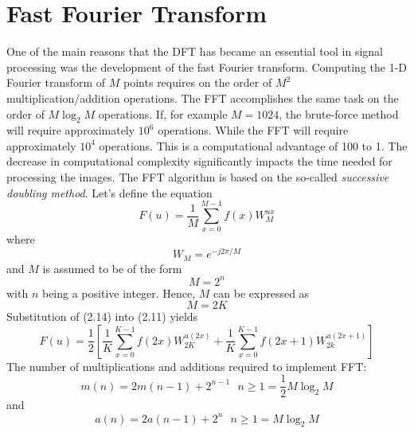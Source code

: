 \section{Fast Fourier Transform}
One of the main reasons that the DFT has became an essential tool in signal processing was the development of the fast Fourier transform. Computing the 1-D Fourier transform of $M$ points requires on the order of $M^2$ multiplication/addition operations. The FFT accomplishes the same task on the order of $M \log_2 M $ operations. If, for example $M = 1024$, the brute-force method will require approximately $10^6$ operations. While the FFT will require approximately $10^4$ operations. This is a computational advantage of 100 to 1. The decrease in computational complexity significantly impacts the time needed for processing the images. The FFT algorithm is based on the so-called \textit{successive doubling method}. Let's define the equation
\begin{equation}
	F(u) = \frac{1}{M} \sum_{x = 0}^{M - 1}f(x)W_M^{ux}
\end{equation}
where 
\begin{equation}
	W_M = e^{-j2\pi / M}
\end{equation}
and $M$ is assumed to be of the form
\begin{equation}
	M = 2^n
\end{equation}
with $n$ being a positive integer. Hence, $M$ can be expressed as 
\begin{equation}
	M = 2K
\end{equation}
Substitution of (2.14) into (2.11) yields
\begin{equation}
	F(u) = \frac{1}{2}[\frac{1}{K}\sum_{x = 0}^{K - 1} f(2x)W^{u(2x)}_{2K} + \frac{1}{K}\sum_{x = 0}^{K - 1}f(2x + 1)W_{2k}^{u(2x + 1)}]
\end{equation}
The number of multiplications and additions required to implement FFT:
\begin{equation}
	m(n) = 2m(n - 1) + 2^{n - 1} \ \ \  n \geq 1 = \frac{1}{2} M \log_2 M
\end{equation}
and
\begin{equation}
	a(n) = 2a(n - 1) + 2^n  \ \ \ n \geq 1 = M \log_2 M
\end{equation}